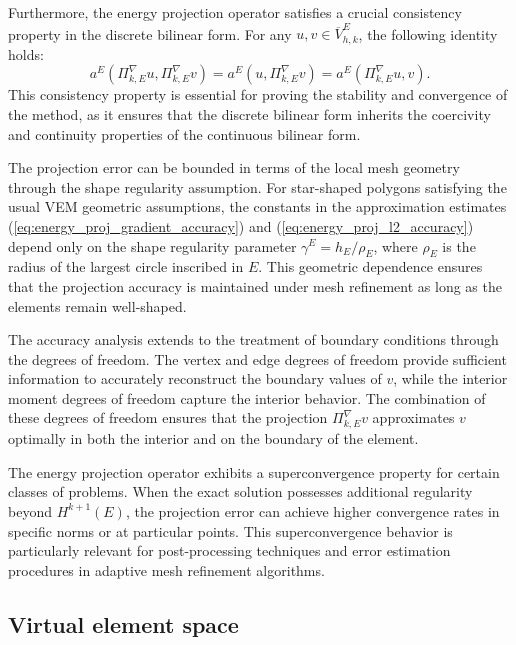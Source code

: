 \documentclass{article}
\begin{document}
Furthermore, the energy projection operator satisfies a crucial consistency property in the discrete bilinear form. For any $u, v \in \overline{V}_{h,k}^E$, the following identity holds:
\begin{equation}\label{eq:energy_proj_consistency}
    a^E(\Pi^\nabla_{k,E} u, \Pi^\nabla_{k,E} v) = a^E(u, \Pi^\nabla_{k,E} v) = a^E(\Pi^\nabla_{k,E} u, v).
\end{equation}
This consistency property is essential for proving the stability and convergence of the method, as it ensures that the discrete bilinear form inherits the coercivity and continuity properties of the continuous bilinear form.

The projection error can be bounded in terms of the local mesh geometry through the shape regularity assumption. For star-shaped polygons satisfying the usual VEM geometric assumptions, the constants in the approximation estimates (\ref{eq:energy_proj_gradient_accuracy}) and (\ref{eq:energy_proj_l2_accuracy}) depend only on the shape regularity parameter $\gamma^E = h_E/\rho_E$, where $\rho_E$ is the radius of the largest circle inscribed in $E$. This geometric dependence ensures that the projection accuracy is maintained under mesh refinement as long as the elements remain well-shaped.

The accuracy analysis extends to the treatment of boundary conditions through the degrees of freedom. The vertex and edge degrees of freedom provide sufficient information to accurately reconstruct the boundary values of $v$, while the interior moment degrees of freedom capture the interior behavior. The combination of these degrees of freedom ensures that the projection $\Pi^\nabla_{k,E} v$ approximates $v$ optimally in both the interior and on the boundary of the element.

The energy projection operator exhibits a superconvergence property for certain classes of problems. When the exact solution possesses additional regularity beyond $H^{k+1}(E)$, the projection error can achieve higher convergence rates in specific norms or at particular points. This superconvergence behavior is particularly relevant for post-processing techniques and error estimation procedures in adaptive mesh refinement algorithms.


\subsection{Virtual element space}
\label{sec:virtual_element_space}
\end{document}
